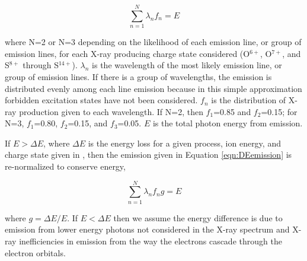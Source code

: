 \documentclass[draft]{agujournal2018}
\begin{document}
\begin{equation}
    \sum_{n=1}^{N}\lambda_{n}f_{n}=E
    \label{eqn:DEemission}
\end{equation}

\noindent where N=2 or N=3 depending on the likelihood of each emission line, or group of emission lines, for each X-ray producing charge state considered (O$^{6+}$, O$^{7+}$, and S$^{8+}$ through S$^{14+}$).
$\lambda_{n}$ is the wavelength of the most likely emission line, or group of emission lines.
If there is a group of wavelengths, the emission is distributed evenly among each line emission because in this simple approximation forbidden excitation states have not been considered.
$f_{n}$ is the distribution of X-ray production given to each wavelength.
If N=2, then $f_{1}$=0.85 and $f_{2}$=0.15; for N=3, $f_{1}$=0.80, $f_{2}$=0.15, and $f_{3}$=0.05.
$E$ is the total photon energy from emission.

If $E>\Delta E$, where $\Delta E$ is the energy loss for a given process, ion energy, and charge state given in \citet{schultz2018}, then the emission given in Equation \ref{eqn:DEemission} is re-normalized to conserve energy,

\begin{equation}
    \sum_{n=1}^{N}\lambda_{n}f_{n}g=E
\end{equation}

\noindent where $g=\Delta E/E$.
If $E<\Delta E$ then we assume the energy difference is due to emission from lower energy photons not considered in the X-ray spectrum and X-ray inefficiencies in emission from the way the electrons cascade through the electron orbitals.

\end{document}
